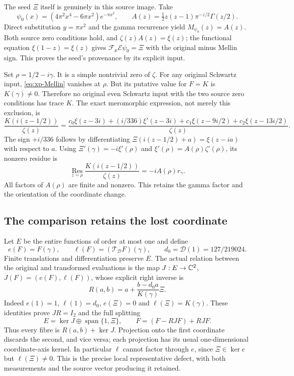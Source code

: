 The seed $\Xi$ itself is genuinely in this source image. Take
\begin{equation}\label{eq:xp-Hermite-seed}
 \psi_0(x)=(4\pi^2x^4-6\pi x^2)e^{-\pi x^2},\qquad
 A(z)=\tfrac12z(z-1)\pi^{-z/2}\Gamma(z/2).
\end{equation}
Direct substitution $y=\pi x^2$ and the gamma recurrence yield
$M_{\psi_0}(z)=A(z)$. Both source zero conditions hold, and
$\zeta(z)A(z)=\xi(z)$; the functional equation
$\xi(1-z)=\xi(z)$ gives
$\mathcal F_\mu\mathcal E\psi_0=\Xi$ with the original minus
Mellin sign. This proves the seed's provenance by its explicit input.

Set $\rho=1/2-i\gamma$. It is a simple nontrivial zero of
$\zeta$. For any original Schwartz input, \eqref{eq:xp-Mellin}
vanishes at $\rho$. But its putative value for $F=K$ is
$K(\gamma)\ne0$. Therefore no original even Schwartz input with
the two source zero conditions has trace $K$.
The exact meromorphic expression, not merely this exclusion, is
\begin{equation}\label{eq:xp-JK}
 \frac{K(i(z-1/2))}{\zeta(z)}
 =\frac{c_0\xi(z-3i)+(i/336)\xi'(z-3i)
       +c_1\xi(z-9i/2)+c_2\xi(z-13i/2)}{\zeta(z)}.
\end{equation}
The sign $+i/336$ follows by differentiating
$\Xi(i(z-1/2)+a)=\xi(z-ia)$ with respect to $a$.
Using $\Xi'(\gamma)=-i\xi'(\rho)$ and
$\xi'(\rho)=A(\rho)\zeta'(\rho)$, its nonzero residue is
\begin{equation}\label{eq:xp-Mellin-residue}
 \operatorname*{Res}_{z=\rho}
 \frac{K(i(z-1/2))}{\zeta(z)}=-iA(\rho)r_\gamma.
\end{equation}
All factors of $A(\rho)$ are finite and nonzero. This retains the
gamma factor and the orientation of the coordinate change.

\subsection{The comparison retains the lost coordinate}

Let $E$ be the entire functions of order at most one and define
\[
 e(F)=F(\gamma),\qquad
 \ell(F)=(\mathcal T_{\mathcal D}F)(\gamma),\qquad
 d_0=\mathcal D(1)=127/219024.
\]
Finite translations and differentiation preserve $E$.
The actual relation between the original and transformed evaluations
is the map $J:E\to\mathbb C^2$, $J(F)=(e(F),\ell(F))$, whose explicit
right inverse is
\begin{equation}\label{eq:xp-right-inverse}
 R(a,b)=a+\frac{b-d_0a}{K(\gamma)}\Xi.
\end{equation}
Indeed $e(1)=1$, $\ell(1)=d_0$, $e(\Xi)=0$ and
$\ell(\Xi)=K(\gamma)$. These identities prove $JR=I_2$ and
the full splitting
\[
 E=\ker J\oplus\operatorname{span}\{1,\Xi\},\qquad
 F=(F-RJF)+RJF.
\]
Thus every fibre is $R(a,b)+\ker J$. Projection onto the first
coordinate discards the second, and vice versa; each projection has
its usual one-dimensional coordinate-axis kernel. In particular
$\ell$ cannot factor through $e$, since $\Xi\in\ker e$ but
$\ell(\Xi)\ne0$. This is the precise local representative defect,
with both measurements and the source vector producing it retained.

